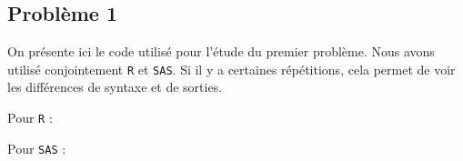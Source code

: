 \documentclass[a4paper]{report}
\begin{document}
  

 
 \begin{appendix}
 \chapter{Problème 1}
  \label{Pb1}
 On présente ici le code utilisé pour l'étude du premier problème. Nous avons utilisé conjointement \verb|R| et \verb|SAS|. Si il y a certaines répétitions, cela permet de voir les différences de syntaxe et de sorties.
 
 Pour \verb|R| : 
\lstset{frame=single, xrightmargin =1cm , xleftmargin =1 cm}


Pour \verb|SAS| : 

\end{appendix}
\end{document}
